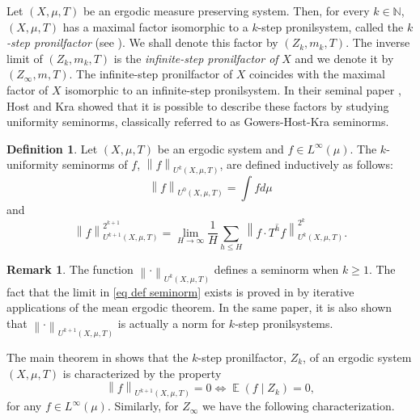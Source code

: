 \documentclass[letter, 11pt]{article}
\theoremstyle{definition}
\newtheorem{defn}[theo]{Definition}
\newtheorem*{remark*}{Remark}
\theoremstyle{plain}
\newcommand{\N}{\mathbb{N}}
\newcommand{\norm}[1]{\left\lVert#1\right\rVert}
\providecommand{\norm}[1]{\lVert #1\rVert}
\newcommand{\1}{\mathbbm{1}}
\newcommand{\E}{\operatorname{\mathbb{E}}}
\begin{document}
Let $(X, \mu,T)$ be an ergodic measure preserving system. Then, for every $k \in \N$, $(X, \mu,T)$ has a maximal factor isomorphic to a $k$-step pronilsystem, called the $k$\emph{-step pronilfactor} (see \cite[Chapter 16]{Host_Kra_nilpotent_structures_ergodic_theory:2018}). We shall denote this factor by $(Z_k,m_k,T)$. The inverse limit of $(Z_k,m_k,T)$ is the \emph{infinite-step pronilfactor of} $X$ and we denote it by $(Z_{\infty}, m,T)$. The infinite-step pronilfactor of $X$ coincides with the maximal factor of $X$ isomorphic to an infinite-step pronilsystem. In their seminal paper \cite{Host_Kra_nonconventional_averages_nilmanifolds:2005}, Host and Kra  showed that it is possible to describe these factors by studying uniformity seminorms, classically referred to as Gowers-Host-Kra seminorms.  

\begin{defn}
    Let $(X, \mu,T)$ be an ergodic system and $f \in L^{\infty}(\mu)$. The $k$-uniformity seminorms of $f$, $\norm{f}_{U^{k}(X,\mu,T)}$, are defined inductively as follows: 
    \begin{equation*}
        \norm{f}_{U^0(X, \mu,T)} =  \int f d\mu 
    \end{equation*}
    and 
    \begin{equation} \label{eq def seminorm}
        \norm{ f}_{U^{k+1}(X, \mu,T)}^{2^{k+1}}= \lim_{H \to \infty }\frac{1}{H} \sum_{h \leq H} \norm{f \cdot \overline{T^hf}}_{U^k(X, \mu,T)}^{2^k}.
    \end{equation}
\end{defn}

\begin{remark*}
    The function $\norm{ \cdot }_{U^{k}(X, \mu,T)}$ defines a seminorm when $k \geq 1$. The fact that the limit in \eqref{eq def seminorm} exists is proved in \cite{Host_Kra_nonconventional_averages_nilmanifolds:2005} by iterative applications of the mean ergodic theorem. In the same paper, it is also shown that $\norm{ \cdot }_{U^{k+1}(X, \mu,T)}$ is actually a norm for $k$-step pronilsystems. 
\end{remark*}

The main theorem in \cite{Host_Kra_nonconventional_averages_nilmanifolds:2005} shows that the $k$-step pronilfactor, $Z_{k}$, of an ergodic system $(X, \mu,T)$ is characterized by the property 
    \begin{equation*} 
        \norm{f}_{U^{k+1}(X, \mu,T)} = 0 \iff \E(f \mid Z_{k}) =0,
    \end{equation*}
    for any $f\in L^{\infty}(\mu)$. Similarly, for $Z_{\infty}$ we have the following characterization.
\end{document}
